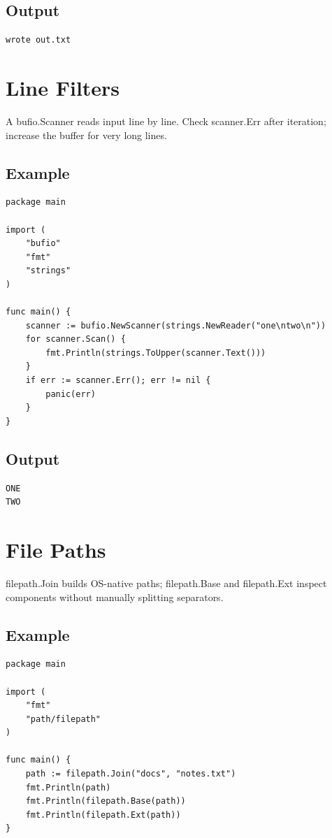 \documentclass[10pt,oneside]{article}
\newcommand{\sectionline}{\par\vspace{4pt}{\color{rule}\hrule height .5pt}\vspace{7pt}\color{ink}\noindent}
\begin{document}
\subsection*{Output}
\begin{lstlisting}[style=terminal]
wrote out.txt
\end{lstlisting}
\clearpage
\section{Line Filters}
\sectionline
A bufio.Scanner reads input line by line. Check scanner.Err after iteration; increase the buffer for very long lines.\par
\subsection*{Example}
\begin{lstlisting}[style=gocode]
package main

import (
	"bufio"
	"fmt"
	"strings"
)

func main() {
	scanner := bufio.NewScanner(strings.NewReader("one\ntwo\n"))
	for scanner.Scan() {
		fmt.Println(strings.ToUpper(scanner.Text()))
	}
	if err := scanner.Err(); err != nil {
		panic(err)
	}
}
\end{lstlisting}
\subsection*{Output}
\begin{lstlisting}[style=terminal]
ONE
TWO
\end{lstlisting}
\clearpage
\section{File Paths}
\sectionline
filepath.Join builds OS-native paths; filepath.Base and filepath.Ext inspect components without manually splitting separators.\par
\subsection*{Example}
\begin{lstlisting}[style=gocode]
package main

import (
	"fmt"
	"path/filepath"
)

func main() {
	path := filepath.Join("docs", "notes.txt")
	fmt.Println(path)
	fmt.Println(filepath.Base(path))
	fmt.Println(filepath.Ext(path))
}
\end{lstlisting}
\end{document}
